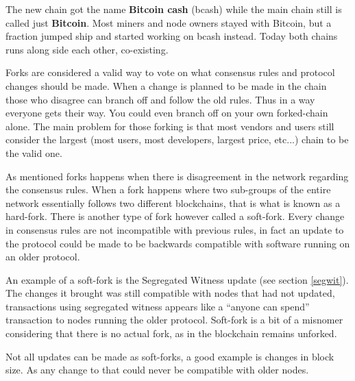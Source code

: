 The new chain got the name \textbf{Bitcoin cash} (bcash) while the main chain still is called just \textbf{Bitcoin}. Most miners and node owners stayed with Bitcoin, but a fraction jumped ship and started working on bcash instead. Today both chains runs along side each other, co-existing.\cite{selena_2017}

Forks are considered a valid way to vote on what consensus rules and protocol changes should be made. When a change is planned to be made in the chain those who disagree can branch off and follow the old rules. Thus in a way everyone gets their way. You could even branch off on your own forked-chain alone. The main problem for those forking is that most vendors and users still consider the largest (most users, most developers, largest price, etc...) chain to be the valid one. 

\label{soft_hard_fork}
As mentioned forks happens when there is disagreement in the network regarding the consensus rules. When a fork happens where two sub-groups of the entire network essentially follows two different blockchains, that is what is known as a hard-fork. There is another type of fork however called a soft-fork.  Every change in consensus rules are not incompatible with previous rules, in fact an update to the protocol could be made to be backwards compatible with software running on an older protocol.\cite{antonopoulos_2017}

An example of a soft-fork is the Segregated Witness update (see section \ref{segwit}). The changes it brought was still compatible with nodes that had not updated, transactions using segregated witness appears like a \enquote{anyone can spend} transaction to nodes running the older protocol. Soft-fork is a bit of a misnomer considering that there is no actual fork, as in the blockchain remains unforked.\cite{antonopoulos_2017}

Not all updates can be made as soft-forks, a good example is changes in block size. As any change to that could never be compatible with older nodes.